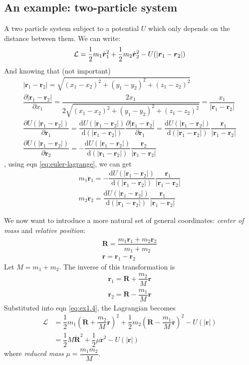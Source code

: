 \documentclass[
  10pt,
  twoside,
  openany,
  b5paper, %
  colorscheme = bootstrap-v4, %
]{qyxf-book}
\numberwithin{equation}{section}
\newcommand{\md}{\mathrm{d}}
\newcommand{\der}[2]{\dfrac{\md #1}{\md #2}}
\newcommand{\p}[2]{\dfrac{\partial #1}{\partial #2}}
\newcommand{\vr}{\boldsymbol{r}}
\newcommand{\dvr}{\dot{\vr}}
\newcommand{\ddvr}{\ddot{\vr}}
\newcommand{\half}{\dfrac{1}{2}}
\newcommand{\lag}{\mathcal{L}} %
\begin{document}
\subsection{An example: two-particle system}
A two particle system subject to a potential $U$ which only depends on the distance between them. We can write:
\begin{equation}
	\lag=\half m_1\dvr_1^2+\half m_2\dvr_2^2-U(|\vr_1-\vr_2|) \label{eq:ex1.4}\\
\end{equation}
And knowing that (not important)
\begin{gather*}
	|\vr_1-\vr_2|=\sqrt{(x_1-x_2)^2+(y_1-y_2)^2+(z_1-z_2)^2}\\
	\p{|\vr_1-\vr_2|}{x_1}=\dfrac{2x_1}{2\sqrt{(x_1-x_2)^2+(y_1-y_2)^2+(z_1-z_2)^2}}=\dfrac{x_1}{|\vr_1-\vr_2|}\\
	\p{U(|\vr_1-\vr_2|)}{\vr_1}=\der{U(|\vr_1-\vr_2|)}{(|\vr_1-\vr_2|)}\p{|\vr_1-\vr_2|}{\vr_1}=\der{U(|\vr_1-\vr_2|)}{(|\vr_1-\vr_2|)}\dfrac{\vr_1}{|\vr_1-\vr_2|}\\
	\p{U(|\vr_1-\vr_2|)}{\vr_2}=-\der{U(|\vr_1-\vr_2|)}{(|\vr_1-\vr_2|)}\dfrac{\vr_2}{|\vr_1-\vr_2|}
\end{gather*}
, using eqn \ref{eq:euler-lagrange}, we can get
\begin{gather*}
	m_1\ddvr_1=-\der{U(|\vr_1-\vr_2|)}{(|\vr_1-\vr_2|)}\dfrac{\vr_1}{|\vr_1-\vr_2|}\\
	m_2\ddvr_2=\der{U(|\vr_1-\vr_2|)}{(|\vr_1-\vr_2|)}\dfrac{\vr_1}{|\vr_1-\vr_2|}
\end{gather*}

We now want to introduce a more natural set of general coordinates: \textit{center of mass} and \textit{relative position}:
\begin{gather*}
	\boldsymbol{R}=\dfrac{m_1\vr_1+m_2\vr_2}{m_1+m_2}\\
	\vr=\vr_1-\vr_2
\end{gather*}
Let $M=m_1+m_2$. The inverse of this transformation is
\begin{gather*}
	\vr_1=\boldsymbol{R}+\dfrac{m_2}{M}\vr\\
	\vr_2=\boldsymbol{R}-\dfrac{m_1}{M}\vr
\end{gather*}
Substituted into eqn \ref{eq:ex1.4}, the Lagrangian becomes
\begin{align*}
	\lag&=
	\half 
	m_1\left(\dot{\boldsymbol{R}}+\dfrac{m_2}{M}\dvr\right)^2+
	\half m_2\left(\dot{\boldsymbol{R}}-\dfrac{m_1}{M}\dvr\right)^2-U(|\vr|)\\
	&=\half M\dot{\boldsymbol{R}}^2+\half\mu\dvr^2-U(|\vr|)
\end{align*}
where \textit{reduced mass} $\mu=\dfrac{m_1m_2}{M}$.
\end{document}
